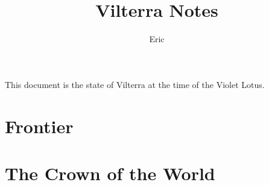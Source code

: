 \documentclass[10pt,twoside,twocolumn,openany,nodeprecatedcode]{dndbook}
\title{Vilterra Notes}
\author{Eric}
\begin{document}
\maketitle

This document is the state of Vilterra at the time of the Violet Lotus.

\chapter{Frontier}%
\label{cha:Frontier}



\chapter{The Crown of the World}%
\label{cha:The Crown of the World}


\end{document}
